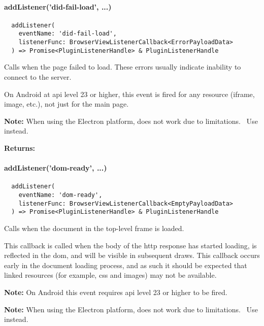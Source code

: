 \paragraph{addListener('did-fail-load', ...)}

\begin{verbatim}
  addListener(
    eventName: 'did-fail-load',
    listenerFunc: BrowserViewListenerCallback<ErrorPayloadData>
  ) => Promise<PluginListenerHandle> & PluginListenerHandle
\end{verbatim}

Calls  when the page failed to load.
These errors usually indicate inability to connect to the server.

On Android at \ac{api} level 23 or higher, this event is fired for any resource (iframe, image, etc.), not just for the main page.~\cite{android:api}

\textbf{Note:} When using the Electron platform,  does not work due to limitations.~\cite{capacitor-electron}
Use  instead.

\textbf{Returns:} 


\paragraph{addListener('dom-ready', ...)}

\begin{verbatim}
  addListener(
    eventName: 'dom-ready',
    listenerFunc: BrowserViewListenerCallback<EmptyPayloadData>
  ) => Promise<PluginListenerHandle> & PluginListenerHandle
\end{verbatim}

Calls  when the document in the top-level frame is loaded.

This callback is called when the body of the \ac{http} response has started loading, is reflected in the \ac{dom}, and will be visible in subsequent draws.
This callback occurs early in the document loading process,
and as such it should be expected that linked resources (for example, \ac{css} and images) may not be available.

\textbf{Note:} On Android this event requires \ac{api} level 23 or higher to be fired.~\cite{android:api}

\textbf{Note:} When using the Electron platform,  does not work due to limitations.~\cite{capacitor-electron}
Use  instead.


